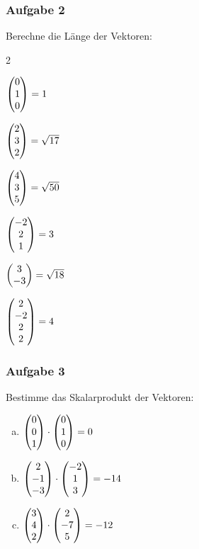 	\subsubsection{Aufgabe 2}
	
		Berechne die Länge der Vektoren:
		
			\begin{enumerate}[a)]
			\end{enumerate}
		
	\subsubsection{Aufgabe 3}
		
		Bestimme das Skalarprodukt der Vektoren:
		
			\begin{enumerate}[a)]
				\item $\mvect{0\\0\\1} \cdot \mvect{0\\1\\0} = 0$
				\item $\mvect{2\\-1\\-3} \cdot \mvect{-2\\1\\3} = -14$
				\item $\mvect{3\\4\\2} \cdot \mvect{2\\-7\\5} = -12$
			\end{enumerate}
		

